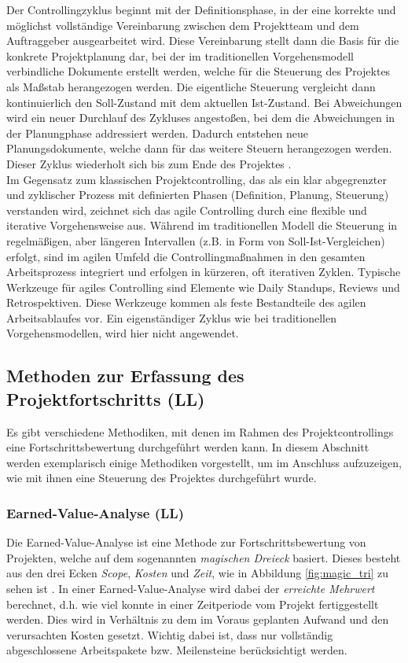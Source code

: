 \documentclass[ThesisDJ.tex]{subfiles}
\begin{document}
    Der Controllingzyklus beginnt mit der Definitionsphase, in der eine korrekte und möglichst vollständige Vereinbarung zwischen dem Projektteam und dem 
    Auftraggeber ausgearbeitet wird. Diese Vereinbarung stellt dann die Basis für die konkrete Projektplanung dar, bei der im traditionellen Vorgehensmodell
    verbindliche Dokumente erstellt werden, welche für die Steuerung des Projektes als Maßstab herangezogen werden. Die eigentliche Steuerung 
    vergleicht dann kontinuierlich den Soll-Zustand mit dem aktuellen Ist-Zustand. Bei Abweichungen wird ein neuer Durchlauf des Zykluses angestoßen, bei dem die 
    Abweichungen in der Planungphase addressiert werden. Dadurch entstehen neue Planungsdokumente, welche dann für das weitere Steuern herangezogen werden. Dieser Zyklus wiederholt sich 
    bis zum Ende des Projektes \cite[S.~217]{dechange_projektmanagement_2024}. \\

    Im Gegensatz zum klassischen Projektcontrolling, das als ein klar abgegrenzter und zyklischer Prozess mit definierten Phasen (Definition, Planung, Steuerung) verstanden wird, 
    zeichnet sich das agile Controlling durch eine flexible und iterative Vorgehensweise aus. 
    Während im traditionellen Modell die Steuerung in regelmäßigen, aber längeren Intervallen (z.B. in Form von Soll-Ist-Vergleichen) erfolgt,
    sind im agilen Umfeld die Controllingmaßnahmen in den gesamten Arbeitsprozess integriert und erfolgen in kürzeren, oft iterativen Zyklen.
    Typische Werkzeuge für agiles Controlling sind Elemente wie Daily Standups, Reviews und Retrospektiven. Diese Werkzeuge kommen als feste Bestandteile 
    des agilen Arbeitsablaufes vor. Ein eigenständiger Zyklus wie bei traditionellen Vorgehensmodellen, wird hier nicht angewendet.

    \subsection{Methoden zur Erfassung des Projektfortschritts (LL)}
    Es gibt verschiedene Methodiken, mit denen im Rahmen des Projektcontrollings eine Fortschrittsbewertung durchgeführt werden kann.
    In diesem Abschnitt werden exemplarisch einige Methodiken vorgestellt, um im Anschluss aufzuzeigen, wie mit ihnen eine Steuerung des Projektes durchgeführt 
    wurde.

    \subsubsection{Earned-Value-Analyse (LL)}
    Die Earned-Value-Analyse ist eine Methode zur Fortschrittsbewertung von Projekten, welche auf dem sogenannten \emph{magischen Dreieck} basiert. Dieses 
    besteht aus den drei Ecken \emph{Scope}, \emph{Kosten} und \emph{Zeit}, wie in Abbildung \ref{fig:magic_tri} zu sehen ist \cite[S.~84]{kuster_handbuch_2022}.
    In einer Earned-Value-Analyse wird dabei der \emph{erreichte Mehrwert} berechnet, d.h. wie viel konnte 
    in einer Zeitperiode vom Projekt fertiggestellt werden. Dies wird in Verhältnis zu dem im Voraus geplanten Aufwand und den verursachten Kosten 
    gesetzt. Wichtig dabei ist, dass nur vollständig abgeschlossene Arbeitspakete bzw. Meilensteine berücksichtigt werden.
    
\end{document}
